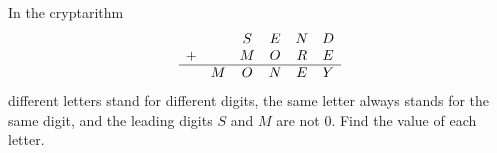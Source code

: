 In the cryptarithm
\[
\begin{array}{cccccc}
 & & S & E & N & D\\
+ & & M & O & R & E\\\hline
 & M & O & N & E & Y
\end{array}
\]
different letters stand for different digits, the same letter always stands for the same digit, and the leading digits $S$ and $M$ are not $0$. Find the value of each letter.
